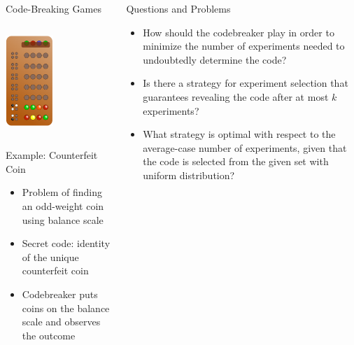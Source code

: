 \documentclass[final]{beamer}
\begin{document}
\begin{frame}{}
\begin{columns}[t, totalwidth=\textwidth]
\begin{column}{.48\textwidth}
\begin{block}{Code-Breaking Games}
\begin{columns}
      \begin{column}{.22\textwidth}
        \includegraphics[width=1.8cm]{../pictures/mastermind.png}
      \end{column}
    \end{columns}
    Example: Counterfeit Coin
        \begin{itemize}
        \item Problem of finding an odd-weight coin using balance scale
        \item Secret code: identity of the unique counterfeit coin 
        \item Codebreaker puts coins on the balance scale and observes the outcome %
        \end{itemize}    
    \end{block}
      
  \end{column}
  \begin{column}{.48\textwidth}

    \begin{block}{Questions and Problems}
      \begin{itemize}
      \item How should the codebreaker play in order to minimize the number of experiments needed to undoubtedly determine the code?
      \item Is there a strategy for experiment selection that guarantees revealing the code after at most $k$ experiments?
      \item What strategy is optimal with respect to the average-case number of experiments, given that the code is selected from the given set with uniform distribution?
      \end{itemize}
    \end{block}


\end{column}
\end{columns}
\end{frame}
\end{document}
